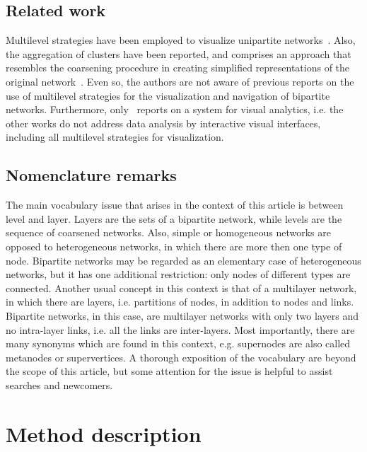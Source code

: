 \documentclass[runningheads]{llncs}
\begin{document}
\subsection{Related work}\label{rel}
Multilevel strategies have been employed to visualize unipartite networks~\cite{u1,u2,u3,u4,u5,u6,u7}.
Also, the aggregation of clusters have been reported, and comprises an approach that resembles
the coarsening procedure in creating simplified representations of the original network~\cite{a1,a2,a3,a4,a5,a6}.
Even so, the authors are not aware of previous reports on the use of multilevel strategies
for the visualization and navigation of bipartite networks.
Furthermore, only~\cite{a1,a2,a3,a4,a6} reports on a system for visual analytics, i.e. the other works do not
address data analysis by interactive visual interfaces,
including all multilevel strategies for visualization.

\subsection{Nomenclature remarks}\label{nom}
The main vocabulary issue that arises in the context of this article is between
level and layer. Layers are the sets of a bipartite network, while levels are the sequence
of coarsened networks.
Also, simple or homogeneous networks are opposed to heterogeneous networks, in which there
are more then one type of node.
Bipartite networks may be regarded as an elementary case of heterogeneous networks,
but it has one additional restriction: only nodes of different types are connected.
Another usual concept in this context is that of a multilayer network, in which there are layers,
i.e. partitions of nodes, in addition to nodes and links.
Bipartite networks, in this case, are multilayer networks with only two layers and no intra-layer links, i.e. all the links are inter-layers.
Most importantly, there are many synonyms which are found in this context, e.g. supernodes are also called metanodes or supervertices.
A thorough exposition of the vocabulary are beyond the scope of this article, but
some attention for the issue is helpful to assist searches and newcomers.

\section{Method description}\label{des}
\end{document}
